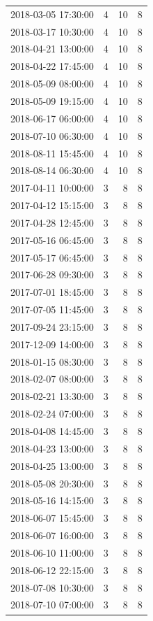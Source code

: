 \begin{tabular}{lrrr}
2018-03-05 17:30:00 & 4 & 10 & 8 \\
2018-03-17 10:30:00 & 4 & 10 & 8 \\
2018-04-21 13:00:00 & 4 & 10 & 8 \\
2018-04-22 17:45:00 & 4 & 10 & 8 \\
2018-05-09 08:00:00 & 4 & 10 & 8 \\
2018-05-09 19:15:00 & 4 & 10 & 8 \\
2018-06-17 06:00:00 & 4 & 10 & 8 \\
2018-07-10 06:30:00 & 4 & 10 & 8 \\
2018-08-11 15:45:00 & 4 & 10 & 8 \\
2018-08-14 06:30:00 & 4 & 10 & 8 \\
2017-04-11 10:00:00 & 3 & 8 & 8 \\
2017-04-12 15:15:00 & 3 & 8 & 8 \\
2017-04-28 12:45:00 & 3 & 8 & 8 \\
2017-05-16 06:45:00 & 3 & 8 & 8 \\
2017-05-17 06:45:00 & 3 & 8 & 8 \\
2017-06-28 09:30:00 & 3 & 8 & 8 \\
2017-07-01 18:45:00 & 3 & 8 & 8 \\
2017-07-05 11:45:00 & 3 & 8 & 8 \\
2017-09-24 23:15:00 & 3 & 8 & 8 \\
2017-12-09 14:00:00 & 3 & 8 & 8 \\
2018-01-15 08:30:00 & 3 & 8 & 8 \\
2018-02-07 08:00:00 & 3 & 8 & 8 \\
2018-02-21 13:30:00 & 3 & 8 & 8 \\
2018-02-24 07:00:00 & 3 & 8 & 8 \\
2018-04-08 14:45:00 & 3 & 8 & 8 \\
2018-04-23 13:00:00 & 3 & 8 & 8 \\
2018-04-25 13:00:00 & 3 & 8 & 8 \\
2018-05-08 20:30:00 & 3 & 8 & 8 \\
2018-05-16 14:15:00 & 3 & 8 & 8 \\
2018-06-07 15:45:00 & 3 & 8 & 8 \\
2018-06-07 16:00:00 & 3 & 8 & 8 \\
2018-06-10 11:00:00 & 3 & 8 & 8 \\
2018-06-12 22:15:00 & 3 & 8 & 8 \\
2018-07-08 10:30:00 & 3 & 8 & 8 \\
2018-07-10 07:00:00 & 3 & 8 & 8 \\

\end{tabular}
